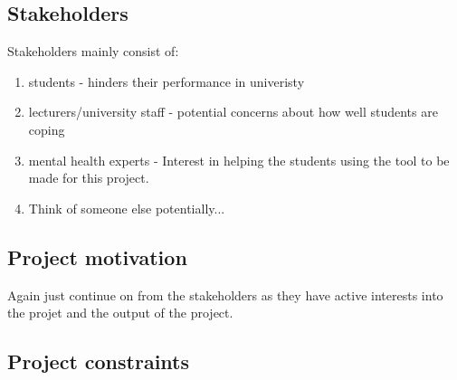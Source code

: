 \subsection{Stakeholders}

Stakeholders mainly consist of: 

\begin{enumerate}
    \item students - hinders their performance in univeristy
    \item lecturers/university staff - potential concerns about how well students are coping
    \item mental health experts - Interest in helping the students using the tool to be made for this project.
    \item Think of someone else potentially...  
\end{enumerate}


\subsection{Project motivation}

Again just continue on from the stakeholders as they have active interests into the projet and the output of the project.

\subsection{Project constraints}